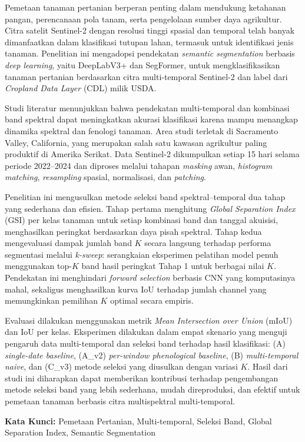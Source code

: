 Pemetaan tanaman pertanian berperan penting dalam mendukung ketahanan pangan, perencanaan pola tanam, serta pengelolaan sumber daya agrikultur.
Citra satelit Sentinel-2 dengan resolusi tinggi spasial dan temporal telah banyak dimanfaatkan dalam klasifikasi tutupan lahan, termasuk untuk identifikasi jenis tanaman.
Penelitian ini mengadopsi pendekatan \textit{semantic segmentation} berbasis \textit{deep learning}, yaitu DeepLabV3+ dan SegFormer, untuk mengklasifikasikan tanaman pertanian berdasarkan citra multi-temporal Sentinel-2 dan label dari \textit{Cropland Data Layer} (CDL) milik USDA.

Studi literatur menunjukkan bahwa pendekatan multi-temporal dan kombinasi band spektral dapat meningkatkan akurasi klasifikasi karena mampu menangkap dinamika spektral dan fenologi tanaman.
Area studi terletak di Sacramento Valley, California, yang merupakan salah satu kawasan agrikultur paling produktif di Amerika Serikat.
Data Sentinel-2 dikumpulkan setiap 15 hari selama periode 2022--2024 dan diproses melalui tahapan \textit{masking} awan, \textit{histogram matching}, \textit{resampling} spasial, normalisasi, dan \textit{patching}.

Penelitian ini mengusulkan metode seleksi band spektral--temporal dua tahap yang sederhana dan efisien.
Tahap pertama menghitung \textit{Global Separation Index} (GSI) per kelas tanaman untuk setiap kombinasi band dan tanggal akuisisi, menghasilkan peringkat berdasarkan daya pisah spektral.
Tahap kedua mengevaluasi dampak jumlah band $K$ secara langsung terhadap performa segmentasi melalui \textit{k-sweep}: serangkaian eksperimen pelatihan model penuh menggunakan top-$K$ band hasil peringkat Tahap 1 untuk berbagai nilai $K$.
Pendekatan ini menghindari \textit{forward selection} berbasis CNN yang komputasinya mahal, sekaligus menghasilkan kurva IoU terhadap jumlah channel yang memungkinkan pemilihan $K$ optimal secara empiris.

Evaluasi dilakukan menggunakan metrik \textit{Mean Intersection over Union} (mIoU) dan IoU per kelas.
Eksperimen dilakukan dalam empat skenario yang menguji pengaruh data multi-temporal dan seleksi band terhadap hasil klasifikasi: (A) \textit{single-date baseline}, (A\_v2) \textit{per-window phenological baseline}, (B) \textit{multi-temporal naive}, dan (C\_v3) metode seleksi yang diusulkan dengan variasi $K$.
Hasil dari studi ini diharapkan dapat memberikan kontribusi terhadap pengembangan metode seleksi band yang lebih sederhana, mudah direproduksi, dan efektif untuk pemetaan tanaman berbasis citra multispektral multi-temporal.

\vspace{0.5cm}
\textbf{Kata Kunci:} Pemetaan Pertanian, Multi-temporal, Seleksi Band, Global Separation Index, Semantic Segmentation
